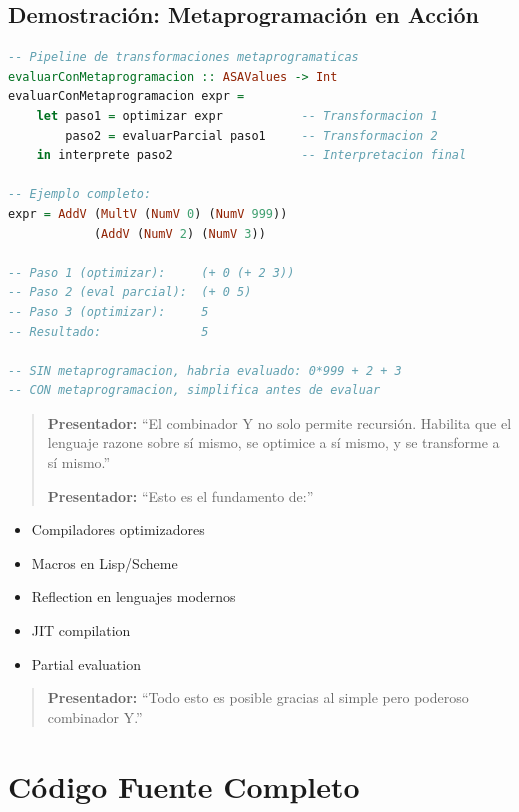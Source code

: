 \documentclass[12pt]{article}
\begin{document}
\subsection*{Demostración: Metaprogramación en Acción}

\begin{lstlisting}[language=Haskell, caption=Pipeline de metaprogramacion completo]
-- Pipeline de transformaciones metaprogramaticas
evaluarConMetaprogramacion :: ASAValues -> Int
evaluarConMetaprogramacion expr =
    let paso1 = optimizar expr           -- Transformacion 1
        paso2 = evaluarParcial paso1     -- Transformacion 2
    in interprete paso2                  -- Interpretacion final

-- Ejemplo completo:
expr = AddV (MultV (NumV 0) (NumV 999))
            (AddV (NumV 2) (NumV 3))

-- Paso 1 (optimizar):     (+ 0 (+ 2 3))
-- Paso 2 (eval parcial):  (+ 0 5)
-- Paso 3 (optimizar):     5
-- Resultado:              5

-- SIN metaprogramacion, habria evaluado: 0*999 + 2 + 3
-- CON metaprogramacion, simplifica antes de evaluar
\end{lstlisting}

\begin{quote}
\textbf{Presentador:} ``El combinador Y no solo permite recursión. Habilita que el lenguaje razone sobre sí mismo, se optimice a sí mismo, y se transforme a sí mismo.''

\textbf{Presentador:} ``Esto es el fundamento de:''
\end{quote}

\begin{itemize}
\item Compiladores optimizadores
\item Macros en Lisp/Scheme
\item Reflection en lenguajes modernos
\item JIT compilation
\item Partial evaluation
\end{itemize}

\begin{quote}
\textbf{Presentador:} ``Todo esto es posible gracias al simple pero poderoso combinador Y.''
\end{quote}

\newpage
\section*{Código Fuente Completo}
\end{document}
